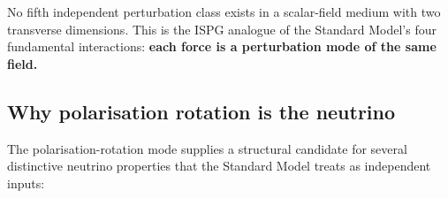 \documentclass[11pt]{article}
\begin{document}
No fifth independent perturbation class exists in
a scalar-field medium with two transverse
dimensions.  This is the ISPG analogue of the
Standard Model's four fundamental interactions:
\textbf{each force is a perturbation mode of the
same field.}

\subsection{Why polarisation rotation is the
neutrino}
\label{sec:torsion_neutrino}

The polarisation-rotation mode supplies a
structural candidate for several distinctive
neutrino properties that the Standard Model treats
as independent inputs:
\end{document}
